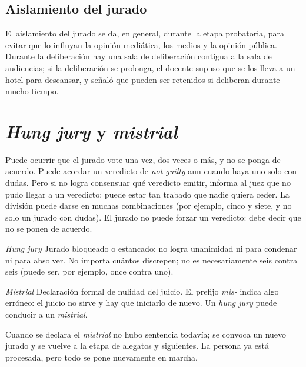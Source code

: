 \documentclass[12pt,oneside]{book}
\begin{document}
\subsection{Aislamiento del jurado}

El aislamiento del jurado se da, en general, durante la etapa probatoria, para evitar que lo influyan la opinión mediática, los medios y la opinión pública. Durante la deliberación hay una sala de deliberación contigua a la sala de audiencias; si la deliberación se prolonga, el docente supuso que se los lleva a un hotel para descansar, y señaló que pueden ser retenidos si deliberan durante mucho tiempo.

\section{\textit{Hung jury} y \textit{mistrial}}

Puede ocurrir que el jurado vote una vez, dos veces o más, y no se ponga de acuerdo. Puede acordar un veredicto de \textit{not guilty} aun cuando haya uno solo con dudas. Pero si no logra consensuar qué veredicto emitir, informa al juez que no pudo llegar a un veredicto; puede estar tan trabado que nadie quiera ceder. La división puede darse en muchas combinaciones (por ejemplo, cinco y siete, y no solo un jurado con dudas). El jurado no puede forzar un veredicto: debe decir que no se ponen de acuerdo.

\begin{definition}{\textit{Hung jury}}
Jurado bloqueado o estancado: no logra unanimidad ni para condenar ni para absolver. No importa cuántos discrepen; no es necesariamente seis contra seis (puede ser, por ejemplo, once contra uno).
\end{definition}

\begin{definition}{\textit{Mistrial}}
Declaración formal de nulidad del juicio. El prefijo \textit{mis-} indica algo erróneo: el juicio no sirve y hay que iniciarlo de nuevo. Un \textit{hung jury} puede conducir a un \textit{mistrial}.
\end{definition}

Cuando se declara el \textit{mistrial} no hubo sentencia todavía; se convoca un nuevo jurado y se vuelve a la etapa de alegatos y siguientes. La persona ya está procesada, pero todo se pone nuevamente en marcha.
\end{document}
